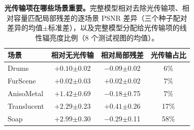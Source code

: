 \begin{table}[t]
\caption{\textbf{光传输项在哪些场景重要。}完整模型相对去除光传输项、相对容量匹配局部残差的逐场景 PSNR 差异（三个种子配对差异的均值$\pm$标准差），以及完整模型分配给光传输项的线性辐亮度比例（8 个测试视图的均值）。}
\label{tab:paired}
\centering\small
\setlength{\tabcolsep}{4pt}
\begin{tabular}{@{}lccc@{}}
\toprule
场景 & 相对无光传输 & 相对局部残差 & 光传输占比 \\
\midrule
Drums & $+0.10${\tiny$\pm$0.02} & $-0.09${\tiny$\pm$0.02} & 6\% \\
FurScene & $+0.02${\tiny$\pm$0.03} & $+0.02${\tiny$\pm$0.02} & 7\% \\
AnisoMetal & $+1.42${\tiny$\pm$0.69} & $-0.18${\tiny$\pm$0.75} & 7\% \\
Translucent & $+2.29${\tiny$\pm$0.23} & $+0.41${\tiny$\pm$0.26} & 17\% \\
Soap & $+2.99${\tiny$\pm$0.30} & $-0.29${\tiny$\pm$0.11} & 58\% \\
\bottomrule
\end{tabular}
\end{table}
